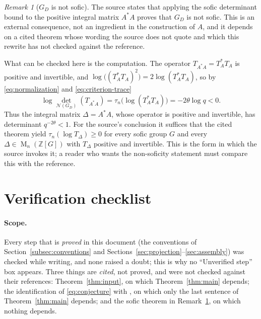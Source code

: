 \documentclass[11pt]{article}
\theoremstyle{remark}
\newtheorem{remark}[theorem]{Remark}
\numberwithin{equation}{section}
\newcommand{\Z}{\mathbb Z}
\newcommand{\Mat}{\operatorname{M}}
\newcommand{\N}{\mathcal N}
\begin{document}
\begin{remark}[$G_D$ is not sofic]\label{rem:sofic}
The source states that applying the sofic determinant bound \cite[Theorem 5]{ElekSzabo2005} to the positive integral matrix $A^*A$ proves that $G_D$ is not sofic. This is an external consequence, not an ingredient in the construction of $A$, and it depends on a cited theorem whose wording the source does not quote and which this rewrite has not checked against the reference.

What can be checked here is the computation. The operator $T_{A^*A}=T_A^*T_A$ is positive and invertible, and $\log\bigl((T_A^*T_A)^2\bigr)=2\log(T_A^*T_A)$, so by \eqref{eq:normalization} and \eqref{eq:criterion-trace}
\[
 \log\det_{\N(G_D)}(T_{A^*A})=\tau_n\bigl(\log(T_A^*T_A)\bigr)=-2\theta\log q<0 .
\]
Thus the integral matrix $\Delta=A^*A$, whose operator is positive and invertible, has determinant $q^{-2\theta}<1$. For the source's conclusion it suffices that the cited theorem yield $\tau_n(\log T_\Delta)\ge0$ for every sofic group $G$ and every $\Delta\in\Mat_n(\Z[G])$ with $T_\Delta$ positive and invertible. This is the form in which the source invokes it; a reader who wants the non-soficity statement must compare this with the reference.
\end{remark}

\section*{Verification checklist}

\paragraph{Scope.} Every step that is \emph{proved} in this document (the conventions of Section~\ref{subsec:conventions} and Sections~\ref{sec:projection}--\ref{sec:assembly}) was checked while writing, and none raised a doubt; this is why no ``Unverified step'' box appears. Three things are \emph{cited}, not proved, and were not checked against their references: Theorem~\ref{thm:input}, on which Theorem~\ref{thm:main} depends; the identification of \eqref{eq:conjecture} with \cite[Conjecture 13.2]{Luck2002}, on which only the last sentence of Theorem~\ref{thm:main} depends; and the sofic theorem in Remark~\ref{rem:sofic}, on which nothing depends.
\end{document}
